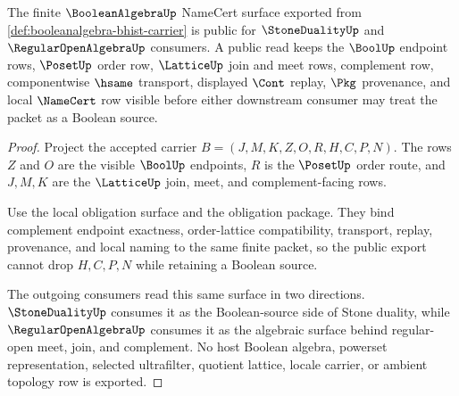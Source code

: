 \begin{theorem}
\label{thm:booleanalgebra-public-namecert-export}
The finite $\BooleanAlgebraUp$ NameCert surface exported from \autoref{def:booleanalgebra-bhist-carrier} is public for $\StoneDualityUp$ and $\RegularOpenAlgebraUp$ consumers. A public read keeps the $\BoolUp$ endpoint rows, $\PosetUp$ order row, $\LatticeUp$ join and meet rows, complement row, componentwise $\hsame$ transport, displayed $\Cont$ replay, $\Pkg$ provenance, and local $\NameCert$ row visible before either downstream consumer may treat the packet as a Boolean source.
\end{theorem}
\begin{proof}
Project the accepted carrier $B=(J,M,K,Z,O,R,H,C,P,N)$. The rows $Z$ and $O$ are the visible $\BoolUp$ endpoints, $R$ is the $\PosetUp$ order route, and $J,M,K$ are the $\LatticeUp$ join, meet, and complement-facing rows.

Use the local obligation surface and the obligation package. They bind complement endpoint exactness, order-lattice compatibility, transport, replay, provenance, and local naming to the same finite packet, so the public export cannot drop $H,C,P,N$ while retaining a Boolean source.

The outgoing consumers read this same surface in two directions. $\StoneDualityUp$ consumes it as the Boolean-source side of Stone duality, while $\RegularOpenAlgebraUp$ consumes it as the algebraic surface behind regular-open meet, join, and complement. No host Boolean algebra, powerset representation, selected ultrafilter, quotient lattice, locale carrier, or ambient topology row is exported.
\end{proof}

